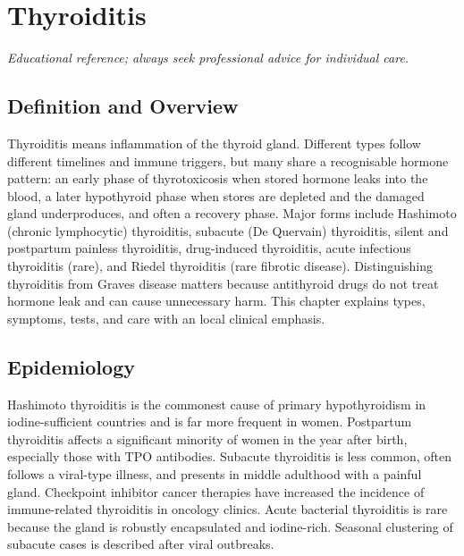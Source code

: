 \chapter{Thyroiditis}

\medskip
\noindent\textit{Educational reference; always seek professional advice for individual care.}

\section*{Definition and Overview}
Thyroiditis means inflammation of the thyroid gland. Different types follow different timelines and immune triggers, but many share a recognisable hormone pattern: an early phase of thyrotoxicosis when stored hormone leaks into the blood, a later hypothyroid phase when stores are depleted and the damaged gland underproduces, and often a recovery phase. Major forms include Hashimoto (chronic lymphocytic) thyroiditis, subacute (De Quervain) thyroiditis, silent and postpartum painless thyroiditis, drug-induced thyroiditis, acute infectious thyroiditis (rare), and Riedel thyroiditis (rare fibrotic disease). Distinguishing thyroiditis from Graves disease matters because antithyroid drugs do not treat hormone leak and can cause unnecessary harm. This chapter explains types, symptoms, tests, and care with an local clinical emphasis.

\section*{Epidemiology}
Hashimoto thyroiditis is the commonest cause of primary hypothyroidism in iodine-sufficient countries and is far more frequent in women. Postpartum thyroiditis affects a significant minority of women in the year after birth, especially those with TPO antibodies. Subacute thyroiditis is less common, often follows a viral-type illness, and presents in middle adulthood with a painful gland. Checkpoint inhibitor cancer therapies have increased the incidence of immune-related thyroiditis in oncology clinics. Acute bacterial thyroiditis is rare because the gland is robustly encapsulated and iodine-rich. Seasonal clustering of subacute cases is described after viral outbreaks.

